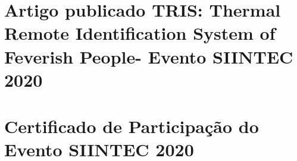 \documentclass[fancyheadings, fancychapter, sureport]{Classes/a-prj}
\begin{document}
\begin{thesisappendices}
        \chapter{Artigo publicado TRIS: Thermal Remote Identification System of Feverish People- Evento SIINTEC 2020}
        \label{append:siintec}
        
        \chapter{Certificado de Participação do Evento SIINTEC 2020}
        \label{append:certificado_siintec}
        



    \end{thesisappendices}
%
%
    
\end{document}
